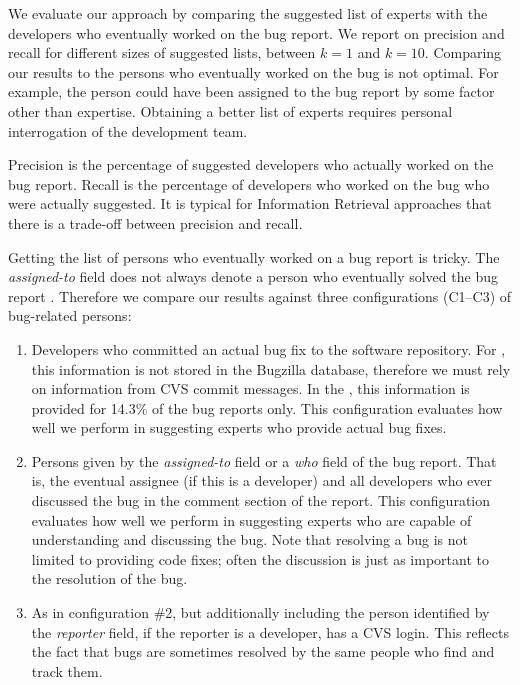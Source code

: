 We evaluate our approach by comparing the suggested list of experts with the developers who eventually worked on the bug report. We report on precision and recall for different sizes of suggested lists, between $k = 1$ and $k = 10$. Comparing our results to the persons who eventually worked on the bug is not optimal. For example, the person could have been assigned to the bug report by some factor other than expertise. Obtaining a better list of experts requires personal interrogation of the development team.

Precision is the percentage of suggested developers who actually worked on the bug report. Recall is the percentage of developers who worked on the bug who were actually suggested. It is typical for Information Retrieval approaches that there is a trade-off between precision and recall.

Getting the list of persons who eventually worked on a bug report is tricky. The \emph{assigned-to} field does not always denote a person who eventually solved the bug report \cite{Cubr04b, Anvi06a, Anvik07}. Therefore we compare our results against three configurations (C1--C3) of bug-related persons:

\begin{enumerate}
\item Developers who committed an actual bug fix to the software repository. For \EC, this information is not stored in the Bugzilla database, therefore we must rely on information from CVS commit messages. In the \validationset, this information is provided for 14.3\% of the bug reports only. This configuration evaluates how well we perform in suggesting experts who provide actual bug fixes.
\item Persons given by the \emph{assigned-to} field or a \emph{who} field of the bug report. That is, the eventual assignee (if this is a developer) and all developers who ever discussed the bug in the comment section of the report. This configuration evaluates how well we perform in suggesting experts who are capable of understanding and discussing the bug. Note that resolving a bug is not limited to providing code fixes; often the discussion is just as important to the resolution of the bug. 
\item As in configuration \#2, but additionally including the person identified by the \emph{reporter} field, if the reporter is a developer, \ie has a CVS login. This reflects the fact that bugs are sometimes resolved by the same people who find and track them.
\end{enumerate}

